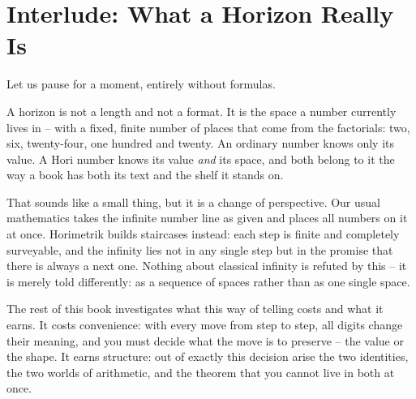\chapter*{Interlude: What a Horizon Really Is}

\begin{oberflaeche}
Let us pause for a moment, entirely without formulas.

A horizon is not a length and not a format. It is the space a
number currently lives in -- with a fixed, finite number of places
that come from the factorials: two, six, twenty-four, one hundred
and twenty. An ordinary number knows only its value. A Hori number
knows its value \emph{and} its space, and both belong to it the way
a book has both its text and the shelf it stands on.

That sounds like a small thing, but it is a change of perspective.
Our usual mathematics takes the infinite number line as given and
places all numbers on it at once. Horimetrik builds staircases
instead: each step is finite and completely surveyable, and the
infinity lies not in any single step but in the promise that there
is always a next one. Nothing about classical infinity is refuted
by this -- it is merely told differently: as a sequence of spaces
rather than as one single space.

The rest of this book investigates what this way of telling costs
and what it earns. It costs convenience: with every move from step
to step, all digits change their meaning, and you must decide what
the move is to preserve -- the value or the shape. It earns
structure: out of exactly this decision arise the two identities,
the two worlds of arithmetic, and the theorem that you cannot live
in both at once.
\end{oberflaeche}
